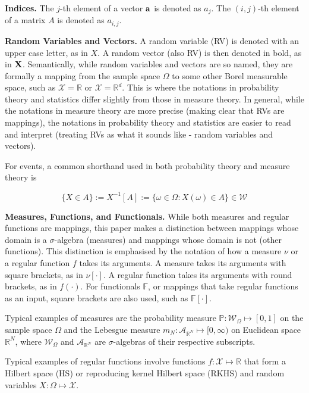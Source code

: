 \documentclass[twoside]{article} \usepackage{aistats2017}
\theoremstyle{definition}
\newcommand{\rv}[1]{{#1}}
\begin{document}
	\textbf{Indices.} The $j$-th element of a vector $\mathbf{a}$ is denoted as $a_{j}$. The $(i, j)$-th element of a matrix $A$ is denoted as $a_{i, j}$.
	
	\textbf{Random Variables and Vectors.} A random variable (RV) is denoted with an upper case letter, as in $\rv{X}$. A random vector (also RV) is then denoted in bold, as in $\bvec{\rv{X}}$. Semantically, while random variables and vectors are so named, they are formally a mapping from the sample space $\Omega$ to some other Borel measurable space, such as $\mathcal{X} = \mathbb{R}$ or $\mathcal{X} = \mathbb{R}^{d}$. This is where the notations in probability theory and statistics differ slightly from those in measure theory. In general, while the notations in measure theory are more precise (making clear that RVs are mappings), the notations in probability theory and statistics are easier to read and interpret (treating RVs as what it sounds like - random variables and vectors).
	
	For events, a common shorthand used in both probability theory and measure theory is
	
	\begin{equation}
		\{\rv{X} \in A\} := \rv{X}^{-1}[A] := \{\omega \in \Omega : \rv{X}(\omega) \in A\} \in \mathcal{W}
	\end{equation}
	
	\textbf{Measures, Functions, and Functionals.} While both measures and regular functions are mappings, this paper makes a distinction between mappings whose domain is a $\sigma$-algebra (measures) and mappings whose domain is not (other functions). This distinction is emphasised by the notation of how a measure $\nu$ or a regular function $f$ takes its arguments. A measure takes its arguments with square brackets, as in $\nu[\cdot]$. A regular function takes its arguments with round brackets, as in $f(\cdot)$. For functionals $\mathbb{F}$, or mappings that take regular functions as an input, square brackets are also used, such as $\mathbb{F}[\cdot]$.
	
	Typical examples of measures are the probability measure $\mathbb{P} : \mathcal{W}_{\Omega} \mapsto [0, 1]$ on the sample space $\Omega$ and the Lebesgue measure $m_{N} : \mathcal{A}_{\mathbb{R}^{N}} \mapsto [0, \infty)$ on Euclidean space $\mathbb{R}^{N}$, where $\mathcal{W}_{\Omega}$ and $\mathcal{A}_{\mathbb{R}^{N}}$ are $\sigma$-algebras of their respective subscripts.
	
	Typical examples of regular functions involve functions $f : \mathcal{X} \mapsto \mathbb{R}$ that form a Hilbert space (HS) or reproducing kernel Hilbert space (RKHS) and random variables $\rv{X} : \Omega \mapsto \mathcal{X}$.
	
\end{document}
